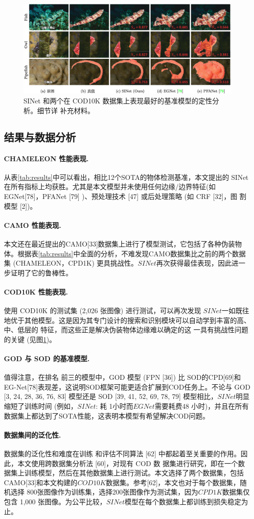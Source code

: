 \documentclass[final]{cvpr}
\newcommand{\mypara}[1]{\paragraph{#1.}}
\renewcommand{\figref}[1]{图\ref{#1}}
\renewcommand{\tabref}[1]{表\ref{#1}}
\begin{document}
\begin{figure}
    \centering
    \includegraphics[width=\textwidth]{COD_Zh_translate/figures/Comparesion_SINet_EGNet_PFANet.png}\small
    \caption{SINet 和两个在 COD10K 数据集上表现最好的基准模型的定性分析。细节详 补充材料。}
    \label{fig:Comparesion_SINet_EGNet_PFANet}
\end{figure}

\subsection{结果与数据分析}
\mypara{CHAMELEON 性能表现}从\tabref{tab:results}中可以看出，相比12个SOTA的物体检测基准，本文提出的 SINet 在所有指标上均获胜。尤其是本文模型并未使用任何边缘/边界特征(如EGNet[78]，PFANet [79] )、预处理技术 [47] 或后处理策略 (如 CRF [32]，图 割模型 [2])。
\mypara{CAMO 性能表现}本文还在最近提出的CAMO[33]数据集上进行了模型测试，它包括了各种伪装物 体。根据\tabref{tab:results}中全面的分析，不难发现CAMO数据集比之前的两个数据集 (CHAMELEON，CPD1K) 更具挑战性。$SINet$再次获得最佳表现，因此进一步证明了它的鲁棒性。
\mypara{COD10K 性能表现}使用 COD10K 的测试集 (2,026 张图像) 进行测试，可以再次发现 $SINet$一如既往地优于其他模型。这是因为其专门设计的搜索和识别模块可以自动学到丰富的高、中、低层的 特征，而这些正是解决伪装物体边缘难以确定的这 一具有挑战性问题的关键 (见\figref{fig:Comparesion_SINet_EGNet_PFANet})。
\mypara{GOD 与 SOD 的基准模型}值得注意，在排名 前三的模型中，GOD 模型 (FPN [36]) 比 SOD的CPD[69]和EG-Net[78]表现差，这说明SOD框架可能更适合扩展到COD任务上。不论与 GOD [3, 24, 28, 36, 76, 83] 模型还是 SOD [39, 41, 52, 69, 78, 79]
模型相比，$SINet$明显缩短了训练时间 (例如，$SINet$: 耗 1小时而$EGNet$需要耗费48 小时)，并且在所有数据集上都达到了SOTA性能，这表明本模型有希望解决COD问题。
\mypara{数据集间的泛化性}数据集的泛化性和难度在训练 和评估不同算法 [62] 中都起着至关重要的作用。因 此，本文使用跨数据集分析法 [60]，对现有 COD 数 据集进行研究，即在一个数据集上训练模型，然后在其他数据集上进行测试。本文选择了两个数据集，包括 CAMO[33]和本文构建的$COD10K$数据集。参考[62]，本文也对于每个数据集，随机选择 800张图像作为训练集，选择200张图像作为测试集，因为$CPD1K$数据集仅包含 1,000 张图像。为公平比较，$SINet$模型在每个数据集上都训练到损失稳定为止。
\end{document}
